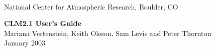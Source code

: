 \documentclass[]{article}
\begin{document}

 \newenvironment{Ventry}[1]%
   {\begin{list}{}{\renewcommand{\makelabel}[1]{\textsf{##1:}\hfil}%
      \settowidth{\labelwidth}{\textsf{#1:}}%
      \setlength{\leftmargin}{4.2cm}%
      \setlength{\labelwidth}{2.7cm}%
      \setlength{\itemsep}{0pt}%
      \setlength{\parsep}{0pt}}}%
   {\end{list}}

\begin{titlepage}

\begin{latexonly}
 \\
\noindent National Center for Atmospheric Research, Boulder, CO \\
\vspace{2in}
\end{latexonly}

\begin{center}
{\Large
  {\bf CLM2.1 User's Guide} \\
  \vspace{0.5in}
  Mariana Vertenstein, Keith Oleson, Sam Levis and Peter Thornton\\
}
  January 2003
\end{center}

\end{titlepage}

\tableofcontents

\newpage














\end{document}
